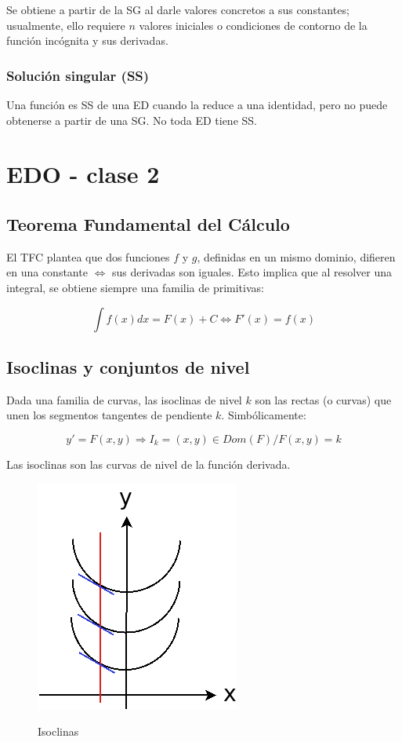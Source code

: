 \documentclass{article}
\begin{document}
Se obtiene a partir de la SG al darle valores concretos a sus constantes; usualmente, ello requiere $n$ valores iniciales o condiciones de contorno de la función incógnita y sus derivadas.

\subsubsection{Solución singular (SS)}

Una función es SS de una ED cuando la reduce a una identidad, pero no puede obtenerse a partir de una SG. No toda ED tiene SS.

\section{EDO - clase 2}

\subsection{Teorema Fundamental del Cálculo}

El TFC plantea que dos funciones $f$ y $g$, definidas en un mismo dominio, difieren en una constante $\Leftrightarrow$ sus derivadas son iguales. Esto implica que al resolver una integral, se obtiene siempre una familia de primitivas:

\begin{equation}
\int f(x) dx = F(x) + C \Leftrightarrow F'(x) = f(x)
\end{equation}

\subsection{Isoclinas y conjuntos de nivel}

Dada una familia de curvas, las isoclinas de nivel $k$ son las rectas (o curvas) que unen los segmentos tangentes de pendiente $k$. Simbólicamente:

\begin{equation}
y' = F(x,y) \Rightarrow I_k = {(x,y) \in Dom(F) / F(x,y) = k}
\end{equation}

Las isoclinas son las curvas de nivel de la función derivada.

\begin{figure}[t]
\caption{Isoclinas}
\includegraphics[scale=0.75]{img/edo_fig001_isoclinas.png} 
\centering
\label{fig:isoclinas}
\end{figure}
\end{document}
